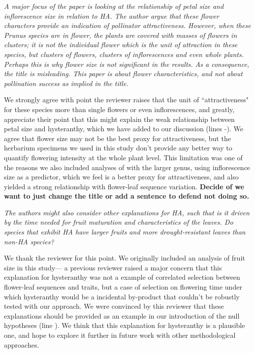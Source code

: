 \documentclass{article}[12pt]
\begin{document}
\emph{A major focus of the paper is looking at the relationship of petal size and inflorescence size in relation to HA. The author argue that these flower characters provide an indication of pollinator attractiveness. However, when these Prunus species are in flower, the plants are covered with masses of flowers in clusters; it is not the individual flower which is the unit of attraction in these species, but clusters of flowers, clusters of inflorescences and even whole plants. Perhaps this is why flower size is not significant in the results.
As a consequence, the title is misleading. This paper is about flower characteristics, and not about pollination success as implied in the title.}

We strongly agree with point the reviewer raises that the unit of ``attractiveness" for these species more than single flowers or even inflorescences, and greatly, appreciate their point that this might explain the weak relationship between petal size and hysteranthy, which we have added to our discussion (lines -). We agree that flower size may not be the best proxy for attractiveness, but the herbarium specimens we used in this study don't provide any better way to quantify flowering intensity at the whole plant level. This limitation was one of the reasons we also included analyses of with the larger genus, using inflorescence size as a predictor, which we feel is a better proxy for attractiveness, and also yielded a strong relationship with flower-leaf sequence variation. \textbf{Decide of we want to just change the title or add a sentence to defend not doing so.}

\emph{The authors might also consider other explanations for HA, such that is it driven by the time needed for fruit maturation and characteristics of the leaves. Do species that exhibit HA have larger fruits and more drought-resistant leaves than non-HA species?}

We thank the reviewer for this point. We originally included an analysis of fruit size in this study--- a previous reviewer raised a major concern that this explanation for hysteranthy was not a example of correlated selection between flower-leaf sequences and traits, but a case of selection on flowering time under which hysteranthy would be a incidental by-product that couldn't be robustly tested with our approach. We were convinced by this reviewer that these explanations should be provided as an example in our introduction of the null hypotheses (line ). We think that this explanation for hysteranthy is a plausible one, and hope to explore it further in future work with other methodological approaches.

 
\end{document}
